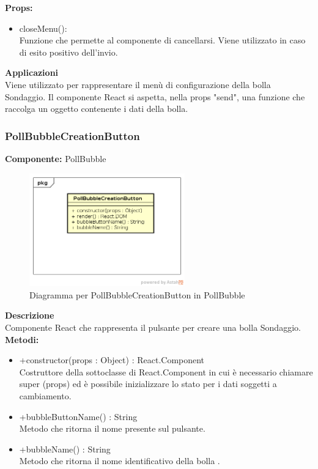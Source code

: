 \textbf{Props:} 
\begin{itemize}
\item closeMenu(): 
\\
Funzione che permette al componente di cancellarsi. Viene utilizzato in caso di esito positivo dell'invio.


\end{itemize} 


\textbf{Applicazioni}\\
Viene utilizzato per rappresentare il menù di configurazione della bolla Sondaggio. Il componente React si aspetta, nella props "send", una funzione che raccolga un oggetto contenente i dati della bolla. 


\clearpage

\subsubsection{PollBubbleCreationButton}
\textbf{Componente:}  PollBubble\\
   \FloatBarrier
   \begin{figure}[ht]
   \centering
   \includegraphics[width=0.6\textwidth]{img/single-PollBubbleCreationButton.png}
   \caption{{Diagramma per PollBubbleCreationButton in PollBubble}}
\end{figure}
\FloatBarrier
\textbf{Descrizione}\\
Componente React che rappresenta il pulsante per creare una bolla Sondaggio.
\\
\textbf{Metodi:} 
\begin{itemize}
\item +constructor(props : Object) : React.Component 
\\
Costruttore della sottoclasse di React.Component in cui è necessario chiamare super (props) ed è possibile inizializzare lo stato per i dati soggetti a cambiamento.

\item +bubbleButtonName() : String 
\\
Metodo che ritorna il nome presente sul pulsante.

\item +bubbleName() : String 
\\
Metodo che ritorna il nome identificativo della bolla .

\end{itemize}


